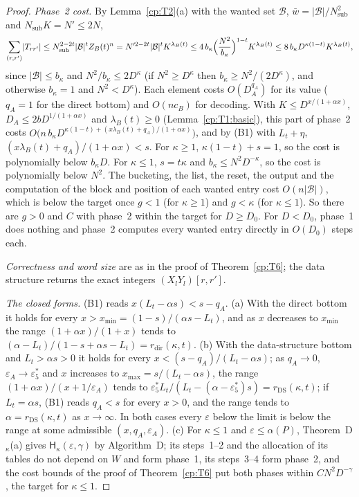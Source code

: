 \documentclass[11pt]{article}
\theoremstyle{definition}
\theoremstyle{remark}
\providecommand{\eps}{\varepsilon}
\newcommand{\abs}[1]{\lvert #1\rvert}
\newcommand{\Hypk}[1]{\mathsf{H}_{#1}}        %
\newcommand{\es}{\varepsilon^*_5}             %
\newcommand{\bk}{b_\kappa}                    %
\newcommand{\cB}{c_B}                         %
\newcommand{\ZB}{Z_B}                         %
\newcommand{\lamB}{\lambda_B}                 %
\newcommand{\ThmDk}{Theorem~D\texorpdfstring{\ensuremath{_\kappa}}{\_kappa}}     %
\newcommand{\AlgD}{Algorithm~D}                             %
\newcommand{\rdir}{r_{\mathrm{dir}}}                 %
\newcommand{\rDS}{r_{\mathrm{DS}}}                   %
\newcommand{\Bt}{\mathcal B}                         %
\begin{document}
\begin{proof}
\emph{Phase~2 cost.} By Lemma~\ref{cp:T2}(a) with the wanted set $\Bt$, $\bar w=\abs\Bt/N_{\mathrm{sub}}^2$ and $N_{\mathrm{sub}}K=N'\le2N$,
\[
\sum_{(r,r')}\abs{T_{rr'}}\le N_{\mathrm{sub}}^{2-2t}\abs\Bt^t\ZB(t)^n=N'^{2-2t}\abs\Bt^tK^{\lamB(t)}\le4\,\bk\Bigl(\frac{N^2}{\bk}\Bigr)^{1-t}K^{\lamB(t)}\le8\,\bk D^{\kappa(1-t)}K^{\lamB(t)},
\]
since $\abs\Bt\le\bk$ and $N^2/\bk\le2D^\kappa$ (if $N^2\ge D^\kappa$ then $\bk\ge N^2/(2D^\kappa)$, and otherwise $\bk=1$ and $N^2<D^\kappa$). Each element costs $O(D_A^{q_A})$ for its value ($q_A=1$ for the direct bottom) and $O(n\cB)$ for decoding. With $K\le D^{x/(1+\alpha x)}$, $D_A\le2bD^{1/(1+\alpha x)}$ and $\lamB(t)\ge0$ (Lemma~\ref{cp:T1:basic}), this part of phase~2 costs $O\bigl(n\,\bk D^{\kappa(1-t)+(x\lamB(t)+q_A)/(1+\alpha x)}\bigr)$, and by (B1) with $L_t+\eta$, $(x\lamB(t)+q_A)/(1+\alpha x)<s$. For $\kappa\ge1$, $\kappa(1-t)+s=1$, so the cost is polynomially below $\bk D$. For $\kappa\le1$, $s=t\kappa$ and $\bk\le N^2D^{-\kappa}$, so the cost is polynomially below $N^2$. The bucketing, the list, the reset, the output and the computation of the block and position of each wanted entry cost $O(n\abs\Bt)$, which is below the target once $g<1$ (for $\kappa\ge1$) and $g<\kappa$ (for $\kappa\le1$). So there are $g>0$ and $C$ with phase~2 within the target for $D\ge D_0$. For $D<D_0$, phase~1 does nothing and phase~2 computes every wanted entry directly in $O(D_0)$ steps each.

\emph{Correctness and word size} are as in the proof of Theorem~\ref{cp:T6}; the data structure returns the exact integers $(X_lY_l)[r,r']$.

\emph{The closed forms.} (B1) reads $x(L_t-\alpha s)<s-q_A$. (a) With the direct bottom it holds for every $x>x_{\min}=(1-s)/(\alpha s-L_t)$, and as $x$ decreases to $x_{\min}$ the range $(1+\alpha x)/(1+x)$ tends to $(\alpha-L_t)/(1-s+\alpha s-L_t)=\rdir(\kappa,t)$. (b) With the data-structure bottom and $L_t>\alpha s>0$ it holds for every $x<(s-q_A)/(L_t-\alpha s)$; as $q_A\to0$, $\eps_A\to\es$ and $x$ increases to $x_{\max}=s/(L_t-\alpha s)$, the range $(1+\alpha x)/(x+1/\eps_A)$ tends to $\es L_t/(L_t-(\alpha-\es)s)=\rDS(\kappa,t)$; if $L_t=\alpha s$, (B1) reads $q_A<s$ for every $x>0$, and the range tends to $\alpha=\rDS(\kappa,t)$ as $x\to\infty$. In both cases every $\eps$ below the limit is below the range at some admissible $(x,q_A,\eps_A)$. (c) For $\kappa\le1$ and $\eps\le\alpha(P)$, \ThmDk{}(a) gives $\Hypk\kappa(\eps,\gamma)$ by \AlgD; its steps~1--2 and the allocation of its tables do not depend on $W$ and form phase~1, its steps~3--4 form phase~2, and the cost bounds of the proof of Theorem~\ref{cp:T6} put both phases within $CN^2D^{-\gamma}$, the target for $\kappa\le1$.
\end{proof}
\end{document}
